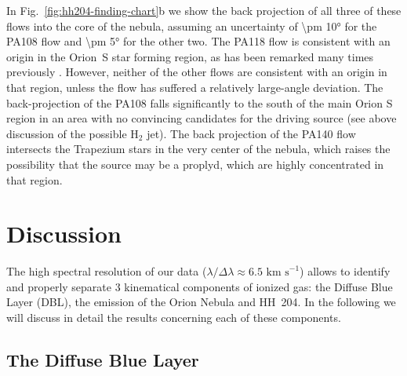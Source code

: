 \documentclass[twocolumn,linenumbers]{aastex63}
\newcommand\chem[1]{\ensuremath{\mathrm{#1}}}
\begin{document}
In Fig.~\ref{fig:hh204-finding-chart}b we show the back projection of all three of these flows into the core of the nebula,
assuming an uncertainty of \ang{\pm 10} for the PA108 flow and \ang{\pm 5} for the other two. The PA118 flow is consistent with an origin in the Orion~S
star forming region, as has been remarked many times previously \citep{ODell:1997a, Rosado:2002e, ODell:2003n}.
However, neither of the other flows are consistent with an origin in that region, unless the flow has suffered a relatively large-angle deviation.
The back-projection of the PA108 falls significantly to the south of the main Orion S region in an area with no convincing candidates for the driving source (see above discussion of the possible \chem{H_2} jet). The back projection of the PA140 flow intersects the Trapezium stars in the very center of the nebula, which raises the possibility that the source may be a proplyd, which are highly concentrated in that region. 






\section{Discussion}
\label{sec:dic}


The high spectral resolution of our data ($\lambda/\Delta \lambda \approx 6.5 \text{ km s}^{-1}$) allows to identify and properly separate 3 kinematical components of ionized gas: the Diffuse Blue Layer (DBL), the emission of the Orion Nebula and HH~204. In the following we will discuss in detail the results concerning each of these components. 

\subsection{The Diffuse Blue Layer}
\label{subsec:disc_blue_layer}
\end{document}
